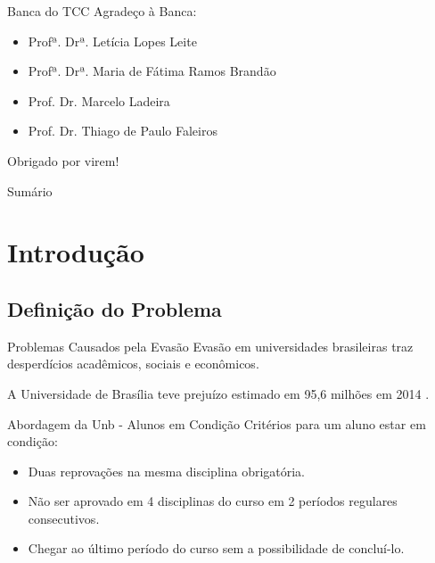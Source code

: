 \begin{frame}{Banca do TCC}
    Agradeço à Banca: 
    \begin{itemize}
        \item Profª. Drª. Letícia Lopes Leite
        \item Profª. Drª. Maria de Fátima Ramos Brandão
        \item Prof. Dr. Marcelo Ladeira 
        \item Prof. Dr. Thiago de Paulo Faleiros
    \end{itemize}
    \vspace{0.5cm}

    Obrigado por virem!
\end{frame}

\begin{frame}{Sumário}
    \tableofcontents[hideallsubsections]
\end{frame}

\section{Introdução}
\subsection{Definição do Problema}
\begin{frame}{Problemas Causados pela Evasão}
    Evasão em universidades brasileiras traz desperdícios acadêmicos, sociais e
    econômicos.  

    \vspace{0.5cm}

    A Universidade de Brasília teve prejuízo estimado em 95,6 milhões em 2014
    \cite{correio}.
\end{frame}

\begin{frame}{Abordagem da Unb - Alunos em Condição}
    Critérios para um aluno estar em condição: 
    \begin{itemize}
        \item Duas reprovações na mesma disciplina obrigatória.
        \item Não ser aprovado em 4 disciplinas do curso em 2 períodos regulares
            consecutivos.
        \item Chegar ao último período do curso sem a possibilidade de concluí-lo. 
    \end{itemize}
\end{frame}

